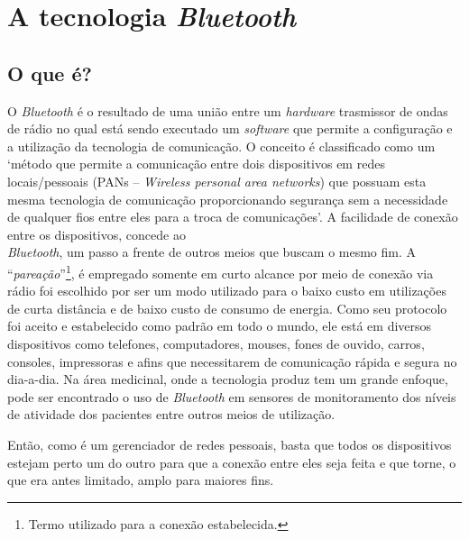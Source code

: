 \documentclass[portugues, brazil, a4paper,12pt]{article}
\begin{document}

\section{A tecnologia \textit{Bluetooth}}
\subsection{O que é?}

O \textit{Bluetooth} é o resultado de uma união entre um \textit{hardware} trasmissor de ondas de rádio no qual está sendo executado um \textit{software} que permite a configuração e a utilização da tecnologia de comunicação. O conceito é classificado como um `método que permite a comunicação entre dois dispositivos em redes locais/pessoais (PANs – \textit{Wireless personal area networks}) que possuam esta mesma tecnologia de comunicação proporcionando segurança sem a necessidade de qualquer fios entre eles para a troca de comunicações'. A facilidade de conexão entre os dispositivos, concede ao \\\textit{Bluetooth}, um passo a frente de outros meios que buscam o mesmo fim. A ``\textit{pareação}''\footnote{Termo utilizado para a conexão estabelecida.}, é empregado somente em curto alcance por meio de conexão via rádio  foi escolhido por ser um modo utilizado para o baixo custo em utilizações de curta distância e de baixo custo de consumo de energia. Como seu protocolo foi aceito e estabelecido como padrão em todo o mundo, ele está em diversos dispositivos como telefones, computadores, mouses, fones de ouvido, carros, consoles, impressoras e afins que necessitarem de comunicação rápida e segura no dia-a-dia. Na área medicinal, onde a tecnologia produz tem um grande enfoque, pode ser encontrado o uso de \textit{Bluetooth} em sensores de monitoramento dos níveis de atividade dos pacientes entre outros meios de utilização.

Então, como é um gerenciador de redes pessoais, basta que todos os dispositivos estejam perto um do outro para que a conexão entre eles seja feita e que torne, o que era antes limitado, amplo para maiores fins.
\end{document}
